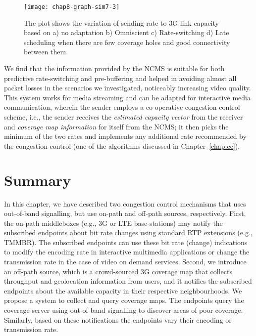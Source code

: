 \begin{figure}[!t]
\texttt{[image: chap8-graph-sim7-3]}
  \caption{The plot shows the variation of sending rate to 3G link capacity
  based on a) no adaptation b) Omniscient c) Rate-switching d) Late scheduling
  when there are few coverage holes and good connectivity between them.}
\label{fig:glass:sim7res}
\end{figure}


We find that the information provided by the NCMS is suitable for both
predictive rate-switching and  pre-buffering and helped in avoiding almost all
packet losses in the scenarios we investigated, noticeably increasing video
quality. This system works for media streaming and can be adapted for
interactive media communication, wherein the sender employs a co-operative
congestion control scheme, i.e., the sender receives the \emph{estimated
capacity vector} from the receiver and \emph{coverage map information} for
itself from the NCMS; it then picks the minimum of the two rates and implements any
additional rate recommended by the congestion control (one of the algorithms
discussed in Chapter~\ref{chap:cc}).

\section{Summary}

In this chapter, we have described two congestion control mechanisms that uses
out-of-band signalling, but use on-path and off-path sources, respectively.
First, the on-path middleboxes (e.g., 3G or LTE base-stations) may notify the
subscribed  endpoints about bit rate changes using standard RTP extensions
(e.g., TMMBR). The subscribed endpoints can use these bit rate (change) indications to
modify the encoding rate in interactive multimedia applications or change
the transmission rate in the case of video on demand services.
%
Second, we introduce an off-path source, which is a crowd-sourced 3G coverage map
that collects throughput and geolocation information from users, and it notifies the
subscribed endpoints about the available capacity in their respective
neighbourhoods. We propose a system to collect and query coverage maps. The
endpoints query the coverage server using out-of-band signalling to discover
areas of poor coverage. Similarly, based on these notifications the endpoints
vary their encoding or transmission rate.

